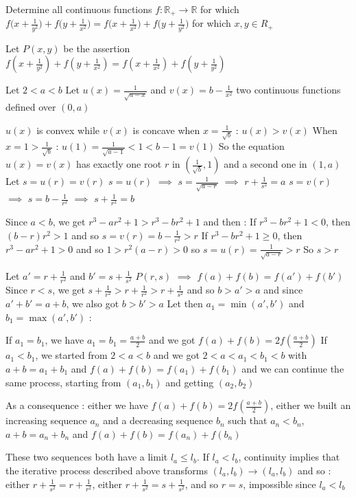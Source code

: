 \begin{solution}
	\begin{tcolorbox}Determine all continuous functions $f: \mathbb{R_+}\to\mathbb{R}$ for which ${{{{f(x+\frac{1}{y^2}})+f(y+\frac{1}{x^2}})=f(x+\frac{1}{x^2}})+f(y+\frac{1}{y^2}})$  for which $x,y{\in}R_+$\end{tcolorbox}
Let $P(x,y)$ be the assertion $f(x+\frac 1{y^2})+f(y+\frac 1{x^2})=f(x+\frac 1{x^2})+f(y+\frac 1{y^2})$

Let $2<a<b$
Let $u(x)=\frac 1{\sqrt{a-x}}$ and $v(x)=b-\frac 1{x^2}$ two continuous functions defined over $(0,a)$

$u(x)$ is convex while $v(x)$ is concave
when $x=\frac 1{\sqrt b}$ : $u(x)>v(x)$
When $x=1>\frac 1{\sqrt b}$ : $u(1)=\frac 1{\sqrt{a-1}}<1<b-1=v(1)$ 
So the equation $u(x)=v(x)$ has exactly one root $r$ in $(\frac 1{\sqrt b},1)$ and a second one in $(1,a)$
Let $s=u(r)=v(r)$
$s=u(r)$ $\implies$ $s=\frac 1{\sqrt{a-r}}$ $\implies$ $r+\frac 1{s^2}=a$
$s=v(r)$ $\implies$ $s=b-\frac 1{r^2}$ $\implies$ $s+\frac 1{r^2}=b$

Since $a<b$, we get $r^3-ar^2+1>r^3-br^2+1$ and then :
If $r^3-br^2+1<0$, then $(b-r)r^2>1$ and so $s=v(r)=b-\frac 1{r^2}>r$
If $r^3-br^2+1\ge 0$, then $r^3-ar^2+1>0$ and so $1>r^2(a-r)>0$ so $s=u(r)=\frac 1{\sqrt{a-r}}>r$
So $s>r$

Let $a'=r+\frac 1{r^2}$ and $b'=s+\frac 1{s^2}$
$P(r,s)$ $\implies$ $f(a)+f(b)=f(a')+f(b')$
Since $r<s$, we get $s+\frac 1{r^2}>r+\frac 1{r^2}>r+\frac 1{s^2}$ and so $b>a'>a$ and since $a'+b'=a+b$, we also got $b>b'>a$
Let then $a_1=\min(a',b')$ and $b_1=\max(a',b')$ :

If $a_1=b_1$, we have $a_1=b_1=\frac{a+b}2$ and we got $f(a)+f(b)=2f(\frac{a+b}2)$
If $a_1<b_1$, we started from $2<a< b$ and we got $2<a<a_1< b_1<b$ with $a+b=a_1+b_1$ and $f(a)+f(b)=f(a_1)+f(b_1)$ and we can continue the same process, starting from $(a_1,b_1)$ and getting $(a_2,b_2)$

As a consequence :
either we have $f(a)+f(b)=2f(\frac{a+b}2)$, either we built an increasing sequence $a_n$ and a decreasing sequence $b_n$ such that $a_n<b_n$, $a+b=a_n+b_n$ and $f(a)+f(b)=f(a_n)+f(b_n)$

These two sequences both have a limit $l_a\le l_b$.
If $l_a<l_b$, continuity implies that the iterative process described above transforms $(l_a,l_b)\to(l_a,l_b)$ and so :
either $r+\frac 1{s^2}=r+\frac 1{r^2}$, either $r+\frac 1{s^2}=s+\frac 1{s^2}$, and so $r=s$, impossible since $l_a<l_b$


\end{solution}
